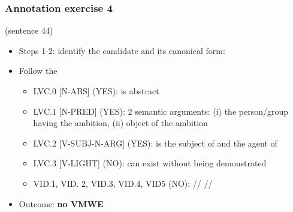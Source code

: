 \documentclass[xcolor=dvipsnames]{beamer}
\begin{document}
\begin{frame} 
\frametitle{Annotation exercise 4}

 (sentence 44)

\begin{scriptsize}
\begin{block}{}
\begin{itemize}
\item Steps 1-2: identify the candidate and its canonical form:  
\item Follow the \href{http://parsemefr.lif.univ-mrs.fr/parseme-st-guidelines/1.3/?page=040\_Annotation\_process\_-\_decision\_tree}{}
   \begin{itemize}
   \item LVC.0 [N-ABS] (YES):  is abstract
   \item LVC.1 [N-PRED] (YES): 2 semantic arguments: (i) the person/group having the ambition, (ii) object of the ambition
   \item LVC.2 [V-SUBJ-N-ARG] (YES):  is the subject of  and the agent of 
   \item LVC.3 [V-LIGHT] (NO):  can exist without being demonstrated
   \item VID.1, VID. 2, VID.3, VID.4, VID5 (NO): //  //
   \end{itemize}
\item Outcome: \textbf{no VMWE}
\end{itemize}
\end{block}

\end{scriptsize}

\end{frame}
\end{document}
